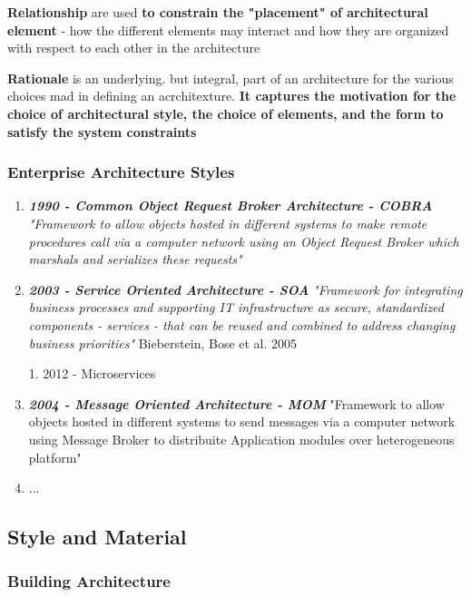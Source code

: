 \textbf{Relationship} are used \textbf{to constrain the "placement" of architectural element} - how the different elements may interact and how they are organized with respect to each other in the architecture

\textbf{Rationale} is an underlying. but integral, part of an architecture for the various choices mad in defining an acrchitexture. \textbf{It captures the motivation for the choice of architectural style, the choice of elements, and the form to satisfy the system constraints}

\subsubsection{Enterprise Architecture Styles}

\begin{enumerate}
	\item \textbf{\textit{1990 - Common Object Request Broker Architecture - COBRA}}
	\textit{"Framework to allow objects hosted in different systems to make remote procedures call via a computer network using an Object Request Broker which marshals and serializes these requests"}	
	
	\item \textbf{\textit{2003 - Service Oriented Architecture - SOA}}
	\textit{"Framework for integrating business processes and supporting IT infrastructure as secure, standardized components - services - that can be reused and combined to address changing business priorities"} Bieberstein, Bose et al. 2005
	
	1. 2012 - Microservices
	
	\item \textbf{\textit{2004 - Message Oriented Architecture - MOM}}
	"Framework to allow objects hosted in different systems to send messages via a computer network using Message Broker to distribuite Application modules over heterogeneous platform"

	\item ...	
\end{enumerate}

\subsection{Style and Material}

\subsubsection{Building Architecture}

